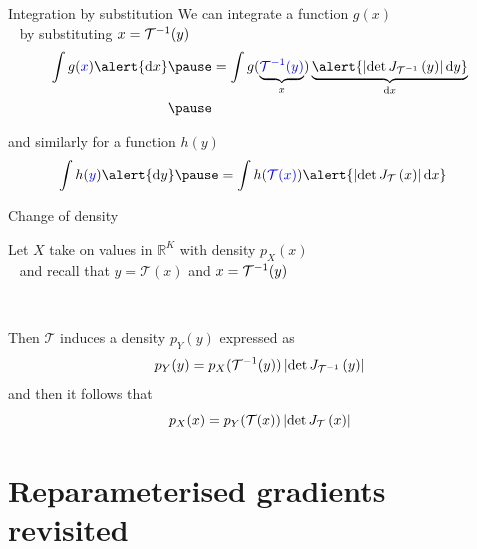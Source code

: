 \documentclass[14pt,dvipsnames]{beamer}
\newcommand{\balert}[1]{\textcolor{blue}{#1}}
\begin{document}
\begin{frame}{Integration by substitution}	
	We can integrate a function $g(x)$ \\
	~ by substituting $x = { \mathcal T}^{-1}(y)$
	\begin{equation*}
	\begin{aligned}
		\int g(\balert{x}) \alert{\dd x} \pause &= \int g(\underbrace{\balert{\inv{\mathcal T}(y)}}_{x}) \underbrace{\alert{\djac{\inv{\mathcal T}}{y} \dd y}}_{\dd x} \\ \pause
	\end{aligned}
	\end{equation*}
	
	\vspace{-10pt}
	and similarly for a function $h(y)$
	\begin{equation*}
	\begin{aligned}
		\int h(\balert{y}) \alert{\dd y} \pause &= \int h(\balert{\mathcal T(x)}) \alert{\djac{\mathcal T}{x} \dd x}
	\end{aligned}
	\end{equation*} 

\end{frame}

\begin{frame}{Change of density}

Let $X$ take on values in $\mathbb R^K$ with density $p_X(x)$\\ \pause
~ and recall that $y = \mathcal T(x)$ and $x = {\mathcal T}^{-1}(y)$\\ \pause

~

Then $\mathcal T$ induces a density $p_Y(y)$ expressed as
\begin{equation*}
p_Y(y) = p_X({\mathcal T}^{-1}(y)) \left|\det J_{{\mathcal T}^{-1}}\left(y\right)\right|
\end{equation*} \pause
and then it follows that
\begin{equation*}
p_X(x) = p_Y(\mathcal T(x)) \left|\det J_{\mathcal T}\left(x\right)\right|
\end{equation*}

	
\end{frame}

\section{Reparameterised gradients revisited}
\end{document}
